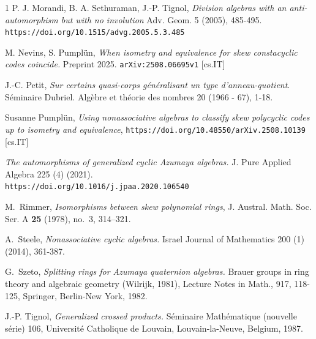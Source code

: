 \documentclass{amsart}
\theoremstyle{plain}
\theoremstyle{definition}
\numberwithin{equation}{section}
\numberwithin{figure}{section}
\begin{document}
\begin{thebibliography}{1}
 P. J. Morandi, B. A. Sethuraman, J.-P. Tignol, \emph{Division algebras with an anti-automorphism but with no involution}
  Adv. Geom. 5 (2005), 485-495. \verb#https://doi.org/10.1515/advg.2005.5.3.485#

   M. Nevins, S. Pumpl\"un, \emph{When isometry and equivalence for skew constacyclic codes coincide.}
Preprint 2025.
\verb#arXiv:2508.06695v1# [cs.IT]

 J.-C. Petit, \emph{Sur certains quasi-corps g\'{e}n\'{e}ralisant un type d'anneau-quotient}.
S\'{e}minaire Dubriel. Alg\`{e}bre et th\'{e}orie des nombres 20 (1966 - 67), 1-18.

Susanne Pumpl\"un, \emph{Using nonassociative algebras to classify skew polycyclic codes up to isometry and equivalence},
\verb#https://doi.org/10.48550/arXiv.2508.10139# [cs.IT]

  \emph{The automorphisms of generalized cyclic Azumaya algebras.}
J. Pure Applied Algebra 225 (4) (2021). \\
\verb#https://doi.org/10.1016/j.jpaa.2020.106540#

M.~Rimmer, \emph{Isomorphisms between skew polynomial rings}, J. Austral. Math. Soc. Ser. A \textbf{25} (1978), no.~3, 314--321. 




 A.~Steele, \emph{ Nonassociative cyclic algebras.}
 Israel Journal of Mathematics 200 (1) (2014),  361-387.

  G.~Szeto, \emph{Splitting rings for Azumaya quaternion algebras.} Brauer groups in ring theory and algebraic geometry (Wilrijk, 1981),  Lecture Notes in Math., 917,  118-125,   Springer, Berlin-New York, 1982.

 J.-P. Tignol, \emph{Generalized crossed products.}  S\'{e}minaire Math\'{e}matique (nouvelle
s\'{e}rie) 106, Universit\'{e} Catholique de Louvain, Louvain-la-Neuve, Belgium,
1987.

\end{thebibliography}
\end{document}
